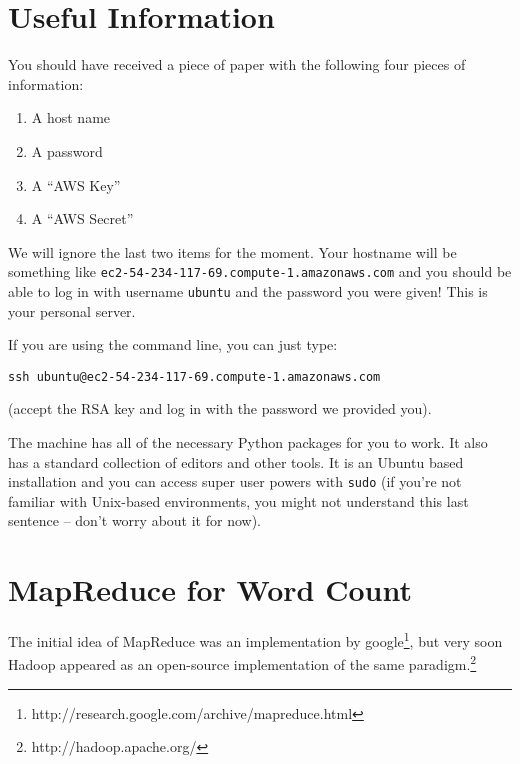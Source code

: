\section{Useful Information}

You should have received a piece of paper with the following four pieces of
information:

\begin{enumerate}
\item A host name
\item A password
\item A ``AWS Key''
\item A ``AWS Secret''
\end{enumerate}

We will ignore the last two items for the moment.  Your hostname will be
something like \texttt{ec2-54-234-117-69.compute-1.amazonaws.com} and you
should be able to log in with username \texttt{ubuntu} and the password you
were given! This is your personal server.

If you are using the command line, you can just type:

\begin{verbatim}
ssh ubuntu@ec2-54-234-117-69.compute-1.amazonaws.com
\end{verbatim}

(accept the RSA key and log in with the password we provided you).

The machine has all of the necessary Python packages for you to work. It also
has a standard collection of editors and other tools. It is an Ubuntu based
installation and you can access super user powers with \texttt{sudo} (if you're
not familiar with Unix-based environments, you might not understand this last
sentence -- don't worry about it for now).

\section{MapReduce for Word Count}

The initial idea of MapReduce was an implementation by
google\footnote{http://research.google.com/archive/mapreduce.html}, but very
soon Hadoop appeared as an open-source implementation of the same
paradigm.\footnote{http://hadoop.apache.org/}

